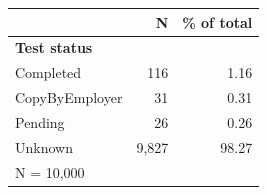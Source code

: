 \begin{tabular}{lrr}


\toprule


 & N & \% of total \\


\midrule


\multicolumn{3}{l}{\textbf{Test status}}\\ 
\midrule
Completed           &         116&        1.16\\
CopyByEmployer      &          31&        0.31\\
Pending             &          26&        0.26\\
Unknown             &       9,827&       98.27\\
\midrule


\multicolumn{3}{l}{\footnotesize N =       10,000}\\


\bottomrule


\end{tabular}


